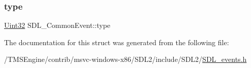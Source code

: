 \subsubsection{\texorpdfstring{type}{type}}
{\footnotesize\ttfamily \hyperlink{_s_d_l__stdinc_8h_add440eff171ea5f55cb00c4a9ab8672d}{Uint32} S\+D\+L\+\_\+\+Common\+Event\+::type}



The documentation for this struct was generated from the following file\+:\begin{DoxyCompactItemize}
\item 
/\+T\+M\+S\+Engine/contrib/msvc-\/windows-\/x86/\+S\+D\+L2/include/\+S\+D\+L2/\hyperlink{_s_d_l__events_8h}{S\+D\+L\+\_\+events.\+h}\end{DoxyCompactItemize}
